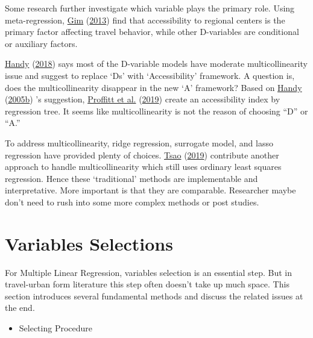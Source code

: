 \documentclass[
  11pt,
  openany]{memoir}
\providecommand{\tightlist}{%
  \setlength{\itemsep}{0pt}\setlength{\parskip}{0pt}}
\begin{document}
Some research further investigate which variable plays the primary role.
Using meta-regression, \protect\hyperlink{ref-gimRelationshipsLandUse2013}{Gim} (\protect\hyperlink{ref-gimRelationshipsLandUse2013}{2013}) find that accessibility to regional centers is the primary factor affecting travel behavior, while other D-variables are conditional or auxiliary factors.

\protect\hyperlink{ref-handyEnoughAlreadyLet2018}{Handy} (\protect\hyperlink{ref-handyEnoughAlreadyLet2018}{2018}) says most of the D-variable models have moderate multicollinearity issue and suggest to replace `Ds' with `Accessibility' framework.
A question is, does the multicollinearity disappear in the new `A' framework?
Based on \protect\hyperlink{ref-handyPlanningAccessibilityTheory2005}{Handy} (\protect\hyperlink{ref-handyPlanningAccessibilityTheory2005}{2005b}) 's suggestion, \protect\hyperlink{ref-proffittAccessibilityPlanningAmerican2019}{Proffitt et al.} (\protect\hyperlink{ref-proffittAccessibilityPlanningAmerican2019}{2019}) create an accessibility index by regression tree. It seems like multicollinearity is not the reason of choosing ``D'' or ``A.''

To address multicollinearity, ridge regression, surrogate model, and lasso regression have provided plenty of choices.
\protect\hyperlink{ref-tsaoEstimableGroupEffects2019}{Tsao} (\protect\hyperlink{ref-tsaoEstimableGroupEffects2019}{2019}) contribute another approach to handle multicollinearity which still uses ordinary least squares regression.
Hence these `traditional' methods are implementable and interpretative. More important is that they are comparable.
Researcher maybe don't need to rush into some more complex methods or post studies.

\hypertarget{variables-selections}{%
\section{Variables Selections}\label{variables-selections}}

For Multiple Linear Regression, variables selection is an essential step.
But in travel-urban form literature this step often doesn't take up much space.
This section introduces several fundamental methods and discuss the related issues at the end.

\begin{itemize}
\tightlist
\item
  Selecting Procedure
\end{itemize}
\end{document}
